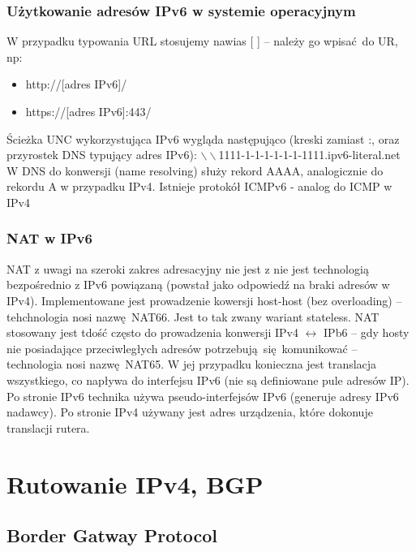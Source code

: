 \documentclass[a4paper, 12pt, titlepage]{article}
\begin{document}
			\subsubsection{Użytkowanie adresów IPv6 w systemie operacyjnym}
				W przypadku typowania URL stosujemy nawias [ ] -- należy go wpisać do UR, np:
				\begin{itemize}
					\item http://[adres IPv6]/ 
					\item https://[adres IPv6]:443/
				\end{itemize}
				Ścieżka UNC wykorzystująca IPv6 wygląda następująco (kreski zamiast :, oraz przyrostek DNS typujący adres IPv6): \newline
				$\backslash \backslash$1111-1-1-1-1-1-1-1111.ipv6-literal.net
				\newline
				\newline
				W DNS do konwersji (name resolving) służy rekord AAAA, analogicznie do rekordu A w przypadku IPv4.
				\newline 
				\newline
				Istnieje protokół ICMPv6 - analog do ICMP w IPv4
			\subsubsection{NAT w IPv6}
				NAT z uwagi na szeroki zakres adresacyjny nie jest z nie jest technologią bezpośrednio z IPv6 powiązaną (powstał jako odpowiedź na braki adresów w IPv4). Implementowane jest prowadzenie kowersji host-host (bez overloading) -- tehchnologia nosi nazwę NAT66. Jest to tak zwany wariant stateless.
				\newline \newline
				NAT stosowany jest tdość często do prowadzenia konwersji IPv4 $\leftrightarrow$ IPb6 -- gdy hosty nie posiadające przeciwległych adresów potrzebują się komunikować -- technologia nosi nazwę NAT65. W jej przypadku konieczna jest translacja wszystkiego, co napływa do interfejsu IPv6 (nie są definiowane pule adresów IP). Po stronie IPv6 technika używa pseudo-interfejsów IPv6 (generuje adresy IPv6 nadawcy). Po stronie IPv4 używany jest adres urządzenia, które dokonuje translacji rutera.
	\newpage
	\section{Rutowanie IPv4, BGP}
		\subsection{Border Gatway Protocol}
\end{document}
